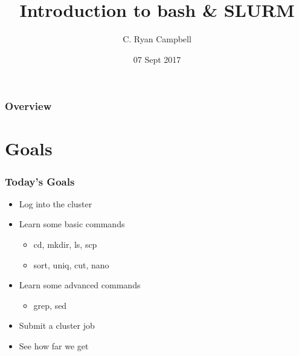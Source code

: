 \documentclass[14pt]{beamer}
\title[bash \& SLURM]{Introduction to bash \& SLURM} %
\author{C. Ryan Campbell} %
\institute[Duke] %
{
Duke University \\ %
\medskip
\textit{c.ryan.campbell@duke.edu} %
}
\date{07 Sept 2017} %
\begin{document}
\begin{frame}
\titlepage %
\end{frame}

\begin{frame}
\frametitle{Overview} %
\tableofcontents %
\end{frame}


\section{Goals} %

\begin{frame}
\frametitle{Today's Goals}
\begin{itemize}
	\item<+-> Log into the cluster
	\item<+-> Learn some basic commands
	\begin{itemize}
		\item<+-> cd, mkdir, ls, scp
		\item<+-> sort, uniq, cut, nano
	\end{itemize}
	\item<+-> Learn some advanced commands
	\begin{itemize}
		\item<+-> grep, sed
	\end{itemize}
	\item<+-> Submit a cluster job
	\item<+-> See how far we get
\end{itemize}
\end{frame}
\end{document}
